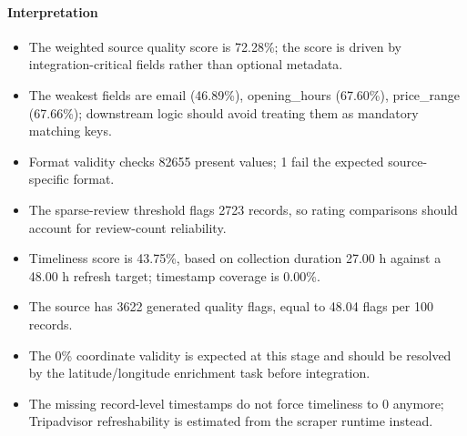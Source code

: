 \paragraph{Interpretation}
\begin{itemize}
\item The weighted source quality score is 72.28\%; the score is driven by integration-critical fields rather than optional metadata.
\item The weakest fields are email (46.89\%), opening\_hours (67.60\%), price\_range (67.66\%); downstream logic should avoid treating them as mandatory matching keys.
\item Format validity checks 82655 present values; 1 fail the expected source-specific format.
\item The sparse-review threshold flags 2723 records, so rating comparisons should account for review-count reliability.
\item Timeliness score is 43.75\%, based on collection duration 27.00 h against a 48.00 h refresh target; timestamp coverage is 0.00\%.
\item The source has 3622 generated quality flags, equal to 48.04 flags per 100 records.
\item The 0\% coordinate validity is expected at this stage and should be resolved by the latitude/longitude enrichment task before integration.
\item The missing record-level timestamps do not force timeliness to 0 anymore; Tripadvisor refreshability is estimated from the scraper runtime instead.
\end{itemize}
